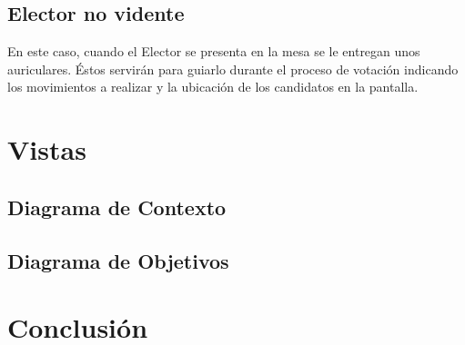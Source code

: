 \documentclass[spanish, 10pt,a4paper]{article}
\numberwithin{equation}{section} %
\begin{document}
\subsection{Elector no vidente}

	En este caso, cuando el Elector se presenta en la mesa se le entregan unos auriculares. Éstos servirán para guiarlo durante el proceso de votación indicando los movimientos a realizar y la ubicación de los candidatos en la pantalla.

\newpage
\section{Vistas}
\subsection{Diagrama de Contexto}


\subsection{Diagrama de Objetivos}

\newpage
\section{Conclusión}
	\newpage
\end{document}
